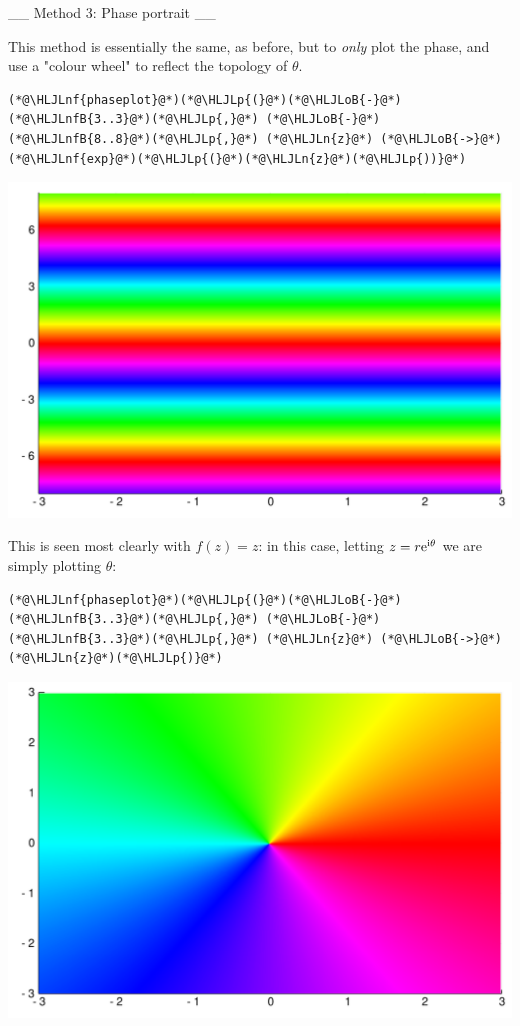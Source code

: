 \documentclass[12pt,a4paper]{article}
\newcommand{\HLJLn}[1]{#1}
\newcommand{\HLJLnf}[1]{\textcolor[RGB]{66,102,213}{#1}}
\newcommand{\HLJLnfB}[1]{\textcolor[RGB]{59,151,46}{#1}}
\newcommand{\HLJLoB}[1]{\textcolor[RGB]{102,102,102}{\textbf{#1}}}
\newcommand{\HLJLp}[1]{#1}
\def\I{ {\rm i} }
\def\E{ {\rm e} }
\begin{document}
\_\_ Method 3: Phase portrait \_\_

This method is essentially the same, as before, but to \emph{only} plot the phase, and use a "colour wheel" to reflect the topology of $\theta$. 


\begin{lstlisting}
(*@\HLJLnf{phaseplot}@*)(*@\HLJLp{(}@*)(*@\HLJLoB{-}@*)(*@\HLJLnfB{3..3}@*)(*@\HLJLp{,}@*) (*@\HLJLoB{-}@*)(*@\HLJLnfB{8..8}@*)(*@\HLJLp{,}@*) (*@\HLJLn{z}@*) (*@\HLJLoB{->}@*) (*@\HLJLnf{exp}@*)(*@\HLJLp{(}@*)(*@\HLJLn{z}@*)(*@\HLJLp{))}@*)
\end{lstlisting}

\includegraphics[width=\linewidth]{figures/Lecture1_4_1.pdf}

This is seen most clearly with $f(z) = z$: in this case, letting $z = r \E^{\I \theta}$ we are simply plotting $\theta$:


\begin{lstlisting}
(*@\HLJLnf{phaseplot}@*)(*@\HLJLp{(}@*)(*@\HLJLoB{-}@*)(*@\HLJLnfB{3..3}@*)(*@\HLJLp{,}@*) (*@\HLJLoB{-}@*)(*@\HLJLnfB{3..3}@*)(*@\HLJLp{,}@*) (*@\HLJLn{z}@*) (*@\HLJLoB{->}@*) (*@\HLJLn{z}@*)(*@\HLJLp{)}@*)
\end{lstlisting}

\includegraphics[width=\linewidth]{figures/Lecture1_5_1.pdf}
\end{document}
